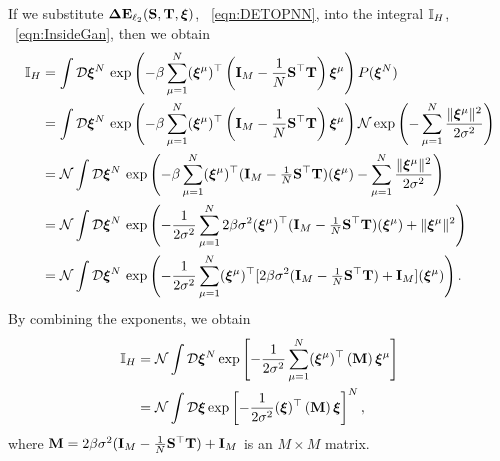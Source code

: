 If we substitute $\mathbf{\Delta {E}}_{\ell_2}({\mathbf{S}},{\mathbf{T}}, \boldsymbol{\xi})$, \EQN~\ref{eqn:DETOPNN}, into the integral $\mathbb{I}_{H}$, \EQN~\ref{eqn:InsideGan}, then we obtain
\begin{align}
\label{eqn:I_1} 
\mathbb{I}_{H} 
  & =  \int \mathcal{D}\boldsymbol{\xi}^{N} \, \exp \left( -\beta\sum_{\mu=1}^{N} (\boldsymbol{\xi}^{\mu})^{\top} \left(\mathbf{I}_{M}-\frac{1}{N} {\mathbf{S}}^{\top}{\mathbf{T}} \right) \boldsymbol{\xi}^{\mu} \right) P(\boldsymbol{\xi}^{N})  \\
\nonumber
  & =  \int \mathcal{D}\boldsymbol{\xi}^{N} \, \exp \left( -\beta\sum_{\mu=1}^{N} (\boldsymbol{\xi}^{\mu})^{\top} \left(\mathbf{I}_{M}-\frac{1}{N} {\mathbf{S}}^{\top}{\mathbf{T}} \right) \boldsymbol{\xi}^{\mu} \right) \mathcal{N} \exp\left( - \sum_{\mu=1}^{N} \frac{\|\boldsymbol{\xi}^{\mu}\|^2}{2 \sigma^2} \right)  \\
    \nonumber
  &= \mathcal{N} \int \mathcal{D}\boldsymbol{\xi}^{N} \, \exp \left(
    -\beta\sum_{\mu=1}^{N} (\boldsymbol{\xi}^{\mu})^{\top} (\mathbf{I}_{M}-\tfrac{1}{N}{\mathbf{S}}^{\top}{\mathbf{T}}) (\boldsymbol{\xi}^{\mu}) 
    - \sum_{\mu=1}^{N} \frac{\|\boldsymbol{\xi}^{\mu}\|^2}{2 \sigma^2} \right) \\ 
\nonumber
  &= \mathcal{N} \int \mathcal{D}\boldsymbol{\xi}^{N} \, \exp \left(
    -\frac{1}{2\sigma^2}\sum_{\mu=1}^{N}2\beta\sigma^{2} (\boldsymbol{\xi}^{\mu})^{\top} (\mathbf{I}_{M}-\tfrac{1}{N}{\mathbf{S}}^{\top}{\mathbf{T}}) (\boldsymbol{\xi}^{\mu}) 
    +  \Vert\boldsymbol{\xi}^{\mu}\Vert^{2} \right) \\ 
\label{eqn:I_3} 
  &= \mathcal{N} \int \mathcal{D}\boldsymbol{\xi}^{N} \, \exp \left(
    -\frac{1}{2\sigma^2}      
      \sum_{\mu=1}^{N}
          (\boldsymbol{\xi}^{\mu})^{\top}[
      2\beta\sigma^{2} (\mathbf{I}_{M}-\tfrac{1}{N}{\mathbf{S}}^{\top}{\mathbf{T}})+\mathbf{I}_{M}] (\boldsymbol{\xi}^{\mu})\right)  .
\end{align}
%
By combining the exponents, we obtain
\begin{align}
\nonumber
\mathbb{I}_{H}
  &=  \mathcal{N}\int \mathcal{D}\boldsymbol{\xi}^{N} 
  \exp\left[
    -\frac{1}{2\sigma^2}\sum_{\mu=1}^{N}(\boldsymbol{\xi}^{\mu})^{\top}
    \left(\mathbf{M}
    \right)
    \boldsymbol{\xi}^{\mu}
    \right ]\\ 
\label{eqn:I_4} 
  &=  \mathcal{N}\int \mathcal{D}\boldsymbol{\xi}  
 \exp\left[
    -\frac{1}{2\sigma^2}(\boldsymbol{\xi})^{\top}
    \left(\mathbf{M}
    \right)
    \boldsymbol{\xi}
    \right]^{N}   ,
\end{align}
where $\mathbf{M}=2\beta\sigma^{2}(\mathbf{I}_{M} - \tfrac{1}{N}{\mathbf{S}}^{\top}{\mathbf{T}})+\mathbf{I}_{M}$ is an $M \times M$ matrix.

